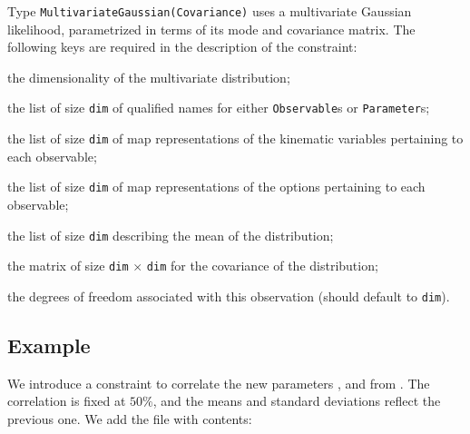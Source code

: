 Type \texttt{MultivariateGaussian(Covariance)} uses a multivariate Gaussian
likelihood, parametrized in terms of its mode and covariance matrix. The
following keys are required in the description of the constraint:
\begin{description}[labelwidth=.15\textwidth]
    \item[\texttt{dim}] the dimensionality of the multivariate distribution;
    \item[\texttt{observables}] the list of size \texttt{dim} of qualified names for either \texttt{Observable}s or \texttt{Parameter}s;
    \item[\texttt{kinematics}] the list of size \texttt{dim} of map representations of the kinematic variables pertaining to each observable;
    \item[\texttt{options}] the list of size \texttt{dim} of map representations of the options pertaining to each observable;
    \item[\texttt{means}] the list of size \texttt{dim} describing the mean of the distribution;
    \item[\texttt{covariance}] the matrix of size \texttt{dim} $\times$ \texttt{dim} for the covariance of the distribution;
    \item[\texttt{dof}] the degrees of freedom associated with this observation (should default to \texttt{dim}).
\end{description}

\subsection*{Example}

We introduce a constraint to correlate the new parameters
, and  from
. The correlation is fixed at $50\%$, and the means
and standard deviations reflect the previous one. We add the file
 with contents:
